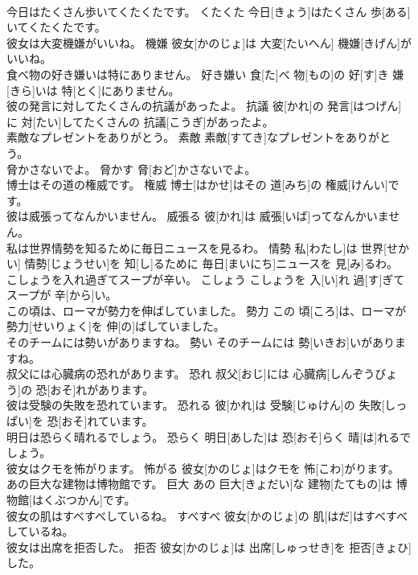 \documentclass[8pt]{extreport}
\begin{document}
\begin{CJK}{UTF8}{min}
\\	今日はたくさん歩いてくたくたです。	くたくた	今日[きょう]はたくさん 歩[ある]いてくたくたです。	
\\	彼女は大変機嫌がいいね。	機嫌	彼女[かのじょ]は 大変[たいへん] 機嫌[きげん]がいいね。	
\\	食べ物の好き嫌いは特にありません。	好き嫌い	食[た]べ 物[もの]の 好[す]き 嫌[きら]いは 特[とく]にありません。	
\\	彼の発言に対してたくさんの抗議があったよ。	抗議	彼[かれ]の 発言[はつげん]に 対[たい]してたくさんの 抗議[こうぎ]があったよ。	
\\	素敵なプレゼントをありがとう。	素敵	素敵[すてき]なプレゼントをありがとう。	
\\	脅かさないでよ。	脅かす	脅[おど]かさないでよ。	
\\	博士はその道の権威です。	権威	博士[はかせ]はその 道[みち]の 権威[けんい]です。	
\\	彼は威張ってなんかいません。	威張る	彼[かれ]は 威張[いば]ってなんかいません。	
\\	私は世界情勢を知るために毎日ニュースを見るわ。	情勢	私[わたし]は 世界[せかい] 情勢[じょうせい]を 知[し]るために 毎日[まいにち]ニュースを 見[み]るわ。	
\\	こしょうを入れ過ぎてスープが辛い。	こしょう	こしょうを 入[い]れ 過[す]ぎてスープが 辛[から]い。	
\\	この頃は、ローマが勢力を伸ばしていました。	勢力	この 頃[ころ]は、ローマが 勢力[せいりょく]を 伸[の]ばしていました。	
\\	そのチームには勢いがありますね。	勢い	そのチームには 勢[いきお]いがありますね。	
\\	叔父には心臓病の恐れがあります。	恐れ	叔父[おじ]には 心臓病[しんぞうびょう]の 恐[おそ]れがあります。	
\\	彼は受験の失敗を恐れています。	恐れる	彼[かれ]は 受験[じゅけん]の 失敗[しっぱい]を 恐[おそ]れています。	
\\	明日は恐らく晴れるでしょう。	恐らく	明日[あした]は 恐[おそ]らく 晴[は]れるでしょう。	
\\	彼女はクモを怖がります。	怖がる	彼女[かのじょ]はクモを 怖[こわ]がります。	
\\	あの巨大な建物は博物館です。	巨大	あの 巨大[きょだい]な 建物[たてもの]は 博物館[はくぶつかん]です。	
\\	彼女の肌はすべすべしているね。	すべすべ	彼女[かのじょ]の 肌[はだ]はすべすべしているね。	
\\	彼女は出席を拒否した。	拒否	彼女[かのじょ]は 出席[しゅっせき]を 拒否[きょひ]した。	

\end{CJK}
\end{document}
